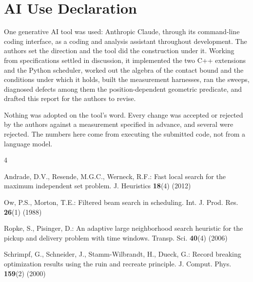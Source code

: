 \documentclass[runningheads]{llncs}
\begin{document}
\section{AI Use Declaration}
\label{sec:ai}

One generative AI tool was used: Anthropic Claude, through its command-line coding interface, as a
coding and analysis assistant throughout development. The authors set the direction and
the tool did the construction under it. Working from specifications settled in discussion, it
implemented the two C++ extensions and the Python scheduler, worked out the algebra of the contact
bound and the conditions under which it holds, built the measurement harnesses, ran the sweeps,
diagnosed defects among them the position-dependent geometric predicate, and drafted this report
for the authors to revise.

Nothing was adopted on the tool's word. Every change was accepted or rejected by the authors against
a measurement specified in advance, and several were rejected. The numbers here come from executing
the submitted code, not from a language model.

\begin{thebibliography}{4}

Andrade, D.V., Resende, M.G.C., Werneck, R.F.: Fast local search for the maximum independent
set problem. J. Heuristics \textbf{18}(4) (2012)

Ow, P.S., Morton, T.E.: Filtered beam search in scheduling. Int. J. Prod. Res. \textbf{26}(1) (1988)

Ropke, S., Pisinger, D.: An adaptive large neighborhood search heuristic for the pickup and
delivery problem with time windows. Transp. Sci. \textbf{40}(4) (2006)

Schrimpf, G., Schneider, J., Stamm-Wilbrandt, H., Dueck, G.: Record breaking optimization
results using the ruin and recreate principle. J. Comput. Phys. \textbf{159}(2) (2000)

\end{thebibliography}
\end{document}
